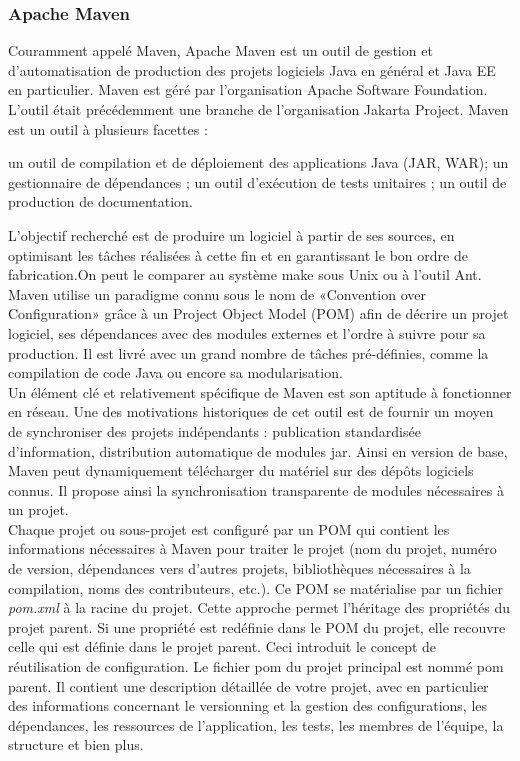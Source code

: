 \subsubsection{Apache Maven}
Couramment appelé Maven, Apache Maven est un outil de gestion et d'automatisation de production des projets logiciels Java en général et Java EE en particulier. Maven est géré par l'organisation Apache Software Foundation. L'outil était précédemment une branche de l'organisation Jakarta Project. Maven est un outil à plusieurs facettes :
\begin{itemize}
	\itemcheck un outil de compilation et de déploiement des applications Java (JAR, WAR);
	\itemcheck un gestionnaire de dépendances ;
	\itemcheck un outil d'exécution de tests unitaires ;
	\itemcheck un outil de production de documentation.
\end{itemize}
L'objectif recherché est de produire un logiciel à partir de ses sources, en optimisant les tâches réalisées à cette fin et en garantissant le bon ordre de fabrication.On peut le comparer au système make sous Unix ou à l'outil Ant.\\
Maven utilise un paradigme connu sous le nom de «Convention over Configuration» grâce à un Project Object Model (POM) afin de décrire un projet logiciel, ses dépendances avec des modules externes et l'ordre à suivre pour sa production. Il est livré avec un grand nombre de tâches pré-définies, comme la compilation de code Java ou encore sa modularisation. \\
Un élément clé et relativement spécifique de Maven est son aptitude à fonctionner en réseau. Une des motivations historiques de cet outil est de fournir un moyen de synchroniser des projets indépendants : publication standardisée d'information, distribution automatique de modules jar. Ainsi en version de base, Maven peut dynamiquement télécharger du matériel sur des dépôts logiciels connus. Il propose ainsi la synchronisation transparente de modules nécessaires à un projet. \cite{maven}\\
Chaque projet ou sous-projet est configuré par un POM qui contient les informations nécessaires à Maven pour traiter le projet (nom du projet, numéro de version, dépendances vers d'autres projets, bibliothèques nécessaires à la compilation, noms des contributeurs, etc.). Ce POM se matérialise par un fichier \textit{pom.xml} à la racine du projet. Cette approche permet l'héritage des propriétés du projet parent. Si une propriété est redéfinie dans le POM du projet, elle recouvre celle qui est définie dans le projet parent. Ceci introduit le concept de réutilisation de configuration. Le fichier pom du projet principal est nommé pom parent. Il contient une description détaillée de votre projet, avec en particulier des informations concernant le versionning et la gestion des configurations, les dépendances, les ressources de l'application, les tests, les membres de l'équipe, la structure et bien plus.\\
